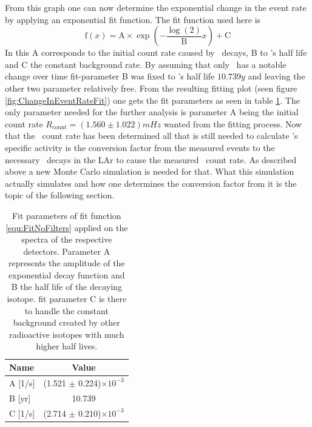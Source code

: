 \documentclass[encoding=utf8,british]{tumphthesis}
\begin{document}
From this graph one can now determine the exponential change in the event rate by applying an exponential fit function.
The fit function used here is
\begin{equation}
\mathrm{f}(x) = \mathrm{A}\times\exp\left(-\frac{\log(2)}{\mathrm{B}} x \right) + \mathrm{C}
\label{equ:FitFilters2}
\end{equation}
In this A corresponds to the initial count rate caused by \Kr\ decays, B to \Kr's half life and C the constant background rate.
By assuming that only \Kr\ has a notable change over time fit-parameter B was fixed to \Kr's half life \(10.739\unit{y}\) and leaving the other two parameter relatively free.
From the resulting fitting plot (seen figure \ref{fig:ChangeInEventRateFit}) one gets the fit parameters as seen in table \ref{tab:FitParZeit}.
The only parameter needed for the further analysis is parameter \(\mathrm{A}\) being the initial count rate $R_{\mathrm{count}} = (1.560\pm1.022) \unit{mHz}$ wanted from the fitting process. 
Now that the \Kr\ count rate has been determined all that is still needed to calculate \Kr's specific activity is the conversion factor from the measured events to the necessary \Kr\ decays in the LAr to cause the measured \Kr\ count rate.
As described above a new Monte Carlo simulation is needed for that.
What this simulation actually simulates and how one determines the conversion factor from it is the topic of the following section.


\begin{table}[t!]
	\centering
	\begin{tabular}{|l|c|}
		\hline
		Name 	& Value  \\ 
		\hline
		A [1/s] &	(1.521 $\pm$ 0.224)$\times10^{-3}$\\	
		\hline
		B [yr] &	10.739\\	
		\hline
		C [1/s] &	(2.714 $\pm$ 0.210)$\times10^{-3}$\\
		\hline
	\end{tabular}
	\caption{
		Fit parameters of fit function \ref{equ:FitNoFilters} applied on the spectra of the respective detectors.
		Parameter A represents the amplitude of the exponential decay function and B the half life of the decaying isotope.
		fit parameter C is there to handle the constant background created by other radioactive isotopes with much higher half lives.
		}
    \label{tab:FitParZeit}
\end{table}
\end{document}
